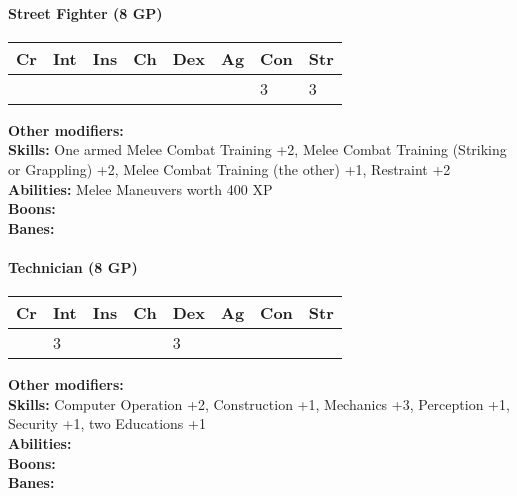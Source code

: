 \paragraph*{Street Fighter (8 GP)}
\textit{}\par
\begin{tabular}{|l|l|l|l|l|l|l|l|}
    \hline
    Cr & Int & Ins & Ch & Dex & Ag & Con & Str \\ \hline
    &  &  &  &  &  & 3 & 3 \\ \hline
\end{tabular}\par
\noindent\textbf{Other modifiers:} \\
\textbf{Skills:} One armed Melee Combat Training +2,
Melee Combat Training (Striking or Grappling) +2,
Melee Combat Training (the other) +1,
Restraint +2\\
\textbf{Abilities:} Melee Maneuvers worth 400 XP\\
\textbf{Boons:} \\
\textbf{Banes:} \\

\hrulefill
\paragraph*{Technician (8 GP)}
\textit{}\par
\begin{tabular}{|l|l|l|l|l|l|l|l|}
    \hline
    Cr & Int & Ins & Ch & Dex & Ag & Con & Str \\ \hline
    & 3 &  &  & 3 &  &  &  \\ \hline
\end{tabular}\par
\noindent\textbf{Other modifiers:} \\
\textbf{Skills:} Computer Operation +2,
Construction +1,
Mechanics +3,
Perception +1,
Security +1,
two Educations +1\\
\textbf{Abilities:} \\
\textbf{Boons:} \\
\textbf{Banes:} \\

\hrulefill

